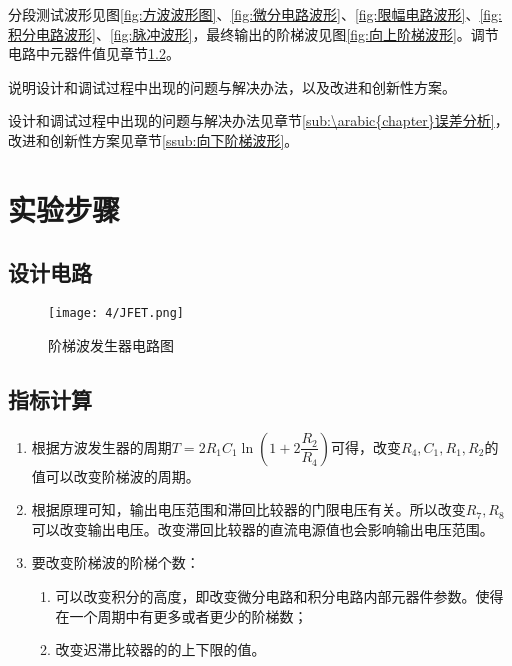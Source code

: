\begin{Answer}
	分段测试波形见图\ref{fig:方波波形图}、\ref{fig:微分电路波形}、\ref{fig:限幅电路波形}、\ref{fig:积分电路波形}、\ref{fig:脉冲波形}，最终输出的阶梯波见图\ref{fig:向上阶梯波形}。调节电路中元器件值见章节\ref{sub:\arabic{chapter}指标计算}。
\end{Answer}

\begin{Exercise}
	说明设计和调试过程中出现的问题与解决办法，以及改进和创新性方案。
\end{Exercise}

\begin{Answer}
	设计和调试过程中出现的问题与解决办法见章节\ref{sub:\arabic{chapter}误差分析}，改进和创新性方案见章节\ref{ssub:向下阶梯波形}。
\end{Answer}

\section{实验步骤}%
\label{sec:\arabic{chapter}实验步骤}

\subsection{设计电路}%
\label{sub:\arabic{chapter}设计电路}

\begin{figure}[H]
	\centering
	\texttt{[image: 4/JFET.png]}
	\caption{阶梯波发生器电路图}
	\label{fig:阶梯波发生器电路图}
\end{figure}

\subsection{指标计算}%
\label{sub:\arabic{chapter}指标计算}

\begin{enumerate}
	\item 根据方波发生器的周期$ T = 2R_1C_1\ln(1 + 2\dfrac{R_2}{R_4}) $可得，改变$ R_4,C_1,R_1,R_2 $的值可以改变阶梯波的周期。
	\item 根据原理可知，输出电压范围和滞回比较器的门限电压有关。所以改变$ R_7,R_8 $可以改变输出电压。改变滞回比较器的直流电源值也会影响输出电压范围。
	\item 要改变阶梯波的阶梯个数：

		\begin{enumerate}
			\item 可以改变积分的高度，即改变微分电路和积分电路内部元器件参数。使得在一个周期中有更多或者更少的阶梯数；
			\item 改变迟滞比较器的的上下限的值。
		\end{enumerate}
\end{enumerate}

